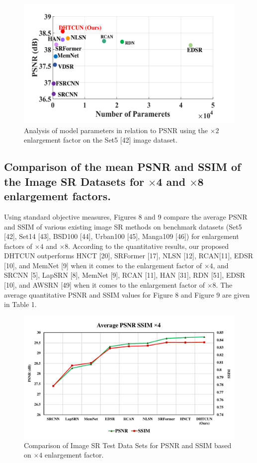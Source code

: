 \documentclass{ieeeaccess}
\begin{document}
\begin{figure}[ht]
  \includegraphics[width=\linewidth]{7FIGURE.pdf}
  \caption{Analysis of model parameters in relation to PSNR using the $\times2$ enlargement factor on the Set5 [42] image dataset.}
  \label{fig:7}
\end{figure}

\subsection{Comparison of the mean PSNR and SSIM of the Image SR Datasets for $\times$4 and $\times$8 enlargement factors. }

Using standard objective measures, Figures 8 and 9 compare the average PSNR and SSIM of various existing image SR methods on benchmark datasets (Set5 [42], Set14 [43], BSD100 [44], Urban100 [45], Manga109 [46]) for enlargement factors of $\times4$ and $\times8$. According to the quantitative results, our proposed DHTCUN outperforms HNCT [20], SRFormer [17], NLSN [12], RCAN[11], EDSR [10], and MemNet [9] when it comes to the enlargement factor of $\times4$, and SRCNN [5], LapSRN [8], MemNet [9], RCAN [11], HAN [31], RDN [51], EDSR [10], and AWSRN [49] when it comes to the enlargement factor of $\times8$. The average quantitative PSNR and SSIM values for Figure 8 and Figure 9 are given in Table 1.

\begin{figure}[ht]
  \includegraphics[width=\linewidth]{8FIGURE.pdf}
  \caption{Comparison of Image SR Test Data Sets for PSNR and SSIM based on $\times4$ enlargement factor.}
  \label{fig:8}
\end{figure}
\end{document}
